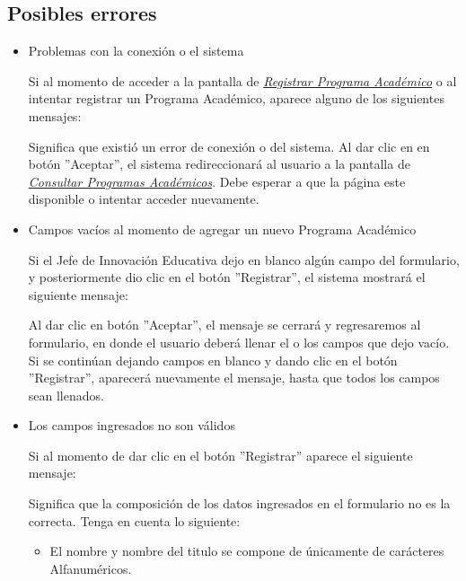         \subsection{Posibles errores}
            \begin{itemize}

                \item Problemas con la conexión o el sistema

                    Si al momento de acceder a la pantalla de \hyperlink{registrarpa}{\textit{Registrar Programa Académico}} o al intentar registrar un Programa Académico, aparece alguno de los siguientes mensajes:

                    Significa que existió un error de conexión o del sistema. Al dar clic en en botón ''Aceptar'', el sistema redireccionará al usuario a la pantalla de \hyperlink{consultarpa}{\textit{Consultar Programas Académicos}}. Debe esperar a que la página este disponible o intentar acceder nuevamente.

                \item Campos vacíos al momento de agregar un nuevo Programa Académico

                    Si el Jefe de Innovación Educativa dejo en blanco algún campo del formulario, y posteriormente dio clic en el botón ''Registrar'', el sistema mostrará el siguiente mensaje:

                    Al dar clic en botón ''Aceptar'', el mensaje se cerrará y regresaremos al formulario, en donde el usuario deberá llenar el o los campos que dejo vacío. Si se continúan dejando campos en blanco y dando clic en el botón ''Registrar'', aparecerá nuevamente el mensaje, hasta que todos los campos sean llenados.\\


                \item Los campos ingresados no son válidos

                    Si al momento de dar clic en el botón ''Registrar'' aparece el siguiente mensaje:

                    Significa que la composición de los datos ingresados en el formulario no es la correcta. Tenga en cuenta lo siguiente:

                    \begin{itemize}
                        \item El nombre y nombre del titulo se compone de únicamente de carácteres Alfanuméricos.
                    \end{itemize}

            \end{itemize}
